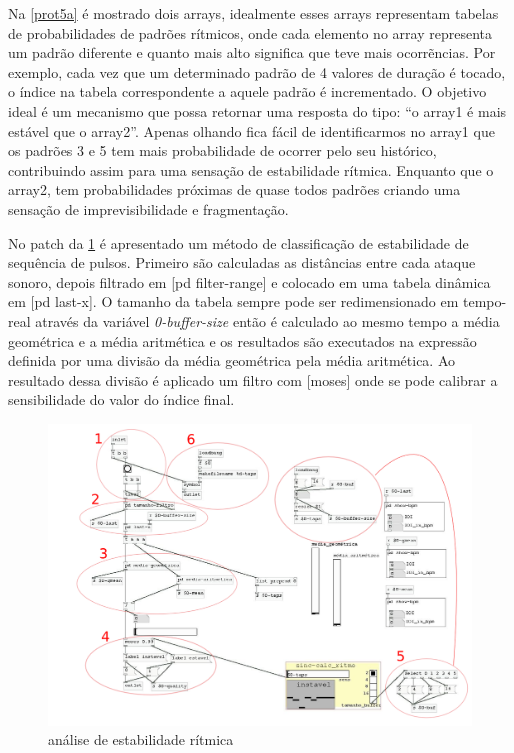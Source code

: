 \documentclass{ppgmus}
\begin{document}
Na \ref{prot5a} é mostrado dois arrays, idealmente esses arrays representam tabelas
de probabilidades de padrões rítmicos, onde cada elemento no array representa um
padrão diferente e quanto mais alto significa que teve mais ocorrẽncias.
Por exemplo, cada vez que um determinado padrão de 4 valores de duração é tocado, 
o índice na tabela correspondente a aquele padrão é incrementado. O objetivo ideal
é um mecanismo que possa retornar uma resposta do tipo:
``o array1 é mais estável que o array2''. Apenas olhando fica fácil de identificarmos
no array1 que os padrões 3 e 5 tem mais probabilidade de ocorrer pelo seu histórico,
contribuindo assim para uma sensação de estabilidade rítmica. Enquanto que o array2,
tem probabilidades próximas de quase todos padrões criando uma sensação de imprevisibilidade
e fragmentação.



No patch da \ref{[sinc-calc-ritmo]} é apresentado um método de classificação de estabilidade
de sequência de pulsos. Primeiro são calculadas as distâncias entre cada ataque
sonoro, depois filtrado em [pd filter-range] e colocado em uma tabela dinâmica em
[pd last-x]. O tamanho da tabela sempre pode ser redimensionado em tempo-real através
da variável \textit{0-buffer-size} então é calculado ao mesmo tempo a média geométrica
e a média aritmética e os resultados são executados na expressão definida por uma
divisão da média geométrica pela média aritmética. %
Ao resultado dessa divisão é aplicado um filtro com [moses] onde se pode calibrar
a sensibilidade do valor do índice final.


\begin{figure}[!htt]
\includegraphics[scale=.5]{sinc-calc-ritmo}
\caption{análise de estabilidade rítmica}
\label{[sinc-calc-ritmo]}
\end{figure}
\end{document}
